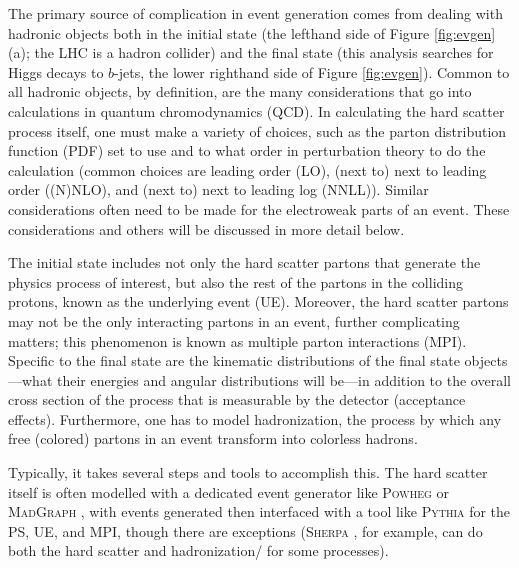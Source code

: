 The primary source of complication in event generation comes from dealing with hadronic objects both in the initial state (the lefthand side of Figure \ref{fig:evgen} (a); the LHC is a hadron collider) and the final state (this analysis searches for Higgs decays to $b$-jets, the lower righthand side of Figure \ref{fig:evgen}).  Common to all hadronic objects, by definition, are the many considerations that go into calculations in quantum chromodynamics (QCD).  In calculating the hard scatter process itself, one must make a variety of choices, such as the parton distribution function (PDF) set to use and to what order in perturbation theory to do the calculation (common choices are leading order (LO), (next to) next to leading order ((N)NLO), and (next to) next to leading log (NNLL)).  Similar considerations often need to be made for the electroweak parts of an event.  These considerations and others will be discussed in more detail below.  

The initial state includes not only the hard scatter partons that generate the physics process of interest, but also the rest of the partons in the colliding protons, known as the underlying event (UE).  Moreover, the hard scatter partons may not be the only interacting partons in an event, further complicating matters; this phenomenon is known as multiple parton interactions (MPI).  Specific to the final state are the kinematic distributions of the final state objects---what their energies and angular distributions will be---in addition to the overall cross section of the process that is measurable by the detector (acceptance effects).  Furthermore, one has to model hadronization, the process by which any free (colored) partons in an event transform into colorless hadrons.

Typically, it takes several steps and tools to accomplish this.  The hard scatter itself is often modelled with a dedicated event generator like \textsc{Powheg} \cite{powheg0} or \textsc{MadGraph} \cite{madgraph}, with events generated then interfaced with a tool like \textsc{Pythia} \cite{pythia8} for the PS, UE, and MPI, though there are exceptions (\textsc{Sherpa} \cite{sherpa}, for example, can do both the hard scatter and hadronization/ for some processes).

